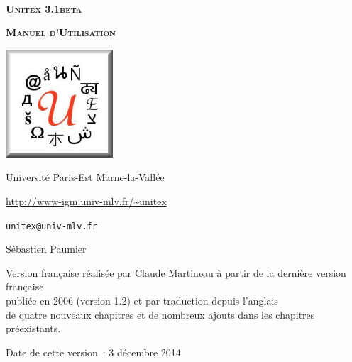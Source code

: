 
\begin{titlepage}
\begin{center}

~

\vspace{3cm}
\Huge
\textsc{\textbf{Unitex 3.1beta}}

\vspace{1cm}

\huge
\textsc{\textbf{Manuel d'Utilisation}}

\vspace{2cm}

  \begin{center}
    \includegraphics[width=4cm]{resources/img/logo-Unitex.png}
  \end{center}
\normalsize

\vspace{2cm}

\LARGE

Université Paris-Est Marne-la-Vallée
\bigskip
\normalsize

\url{http://www-igm.univ-mlv.fr/~unitex}

\verb$unitex@univ-mlv.fr$

\vspace{1cm}

Sébastien Paumier
\bigskip

Version française réalisée par Claude Martineau à partir de la dernière version française\\
publiée en 2006 (version 1.2) et par traduction depuis l'anglais\\
de quatre nouveaux chapitres et de nombreux ajouts dans les chapitres préexistants.
\bigskip

Date de cette version~: 3 décembre 2014

\end{center}

\end{titlepage}
